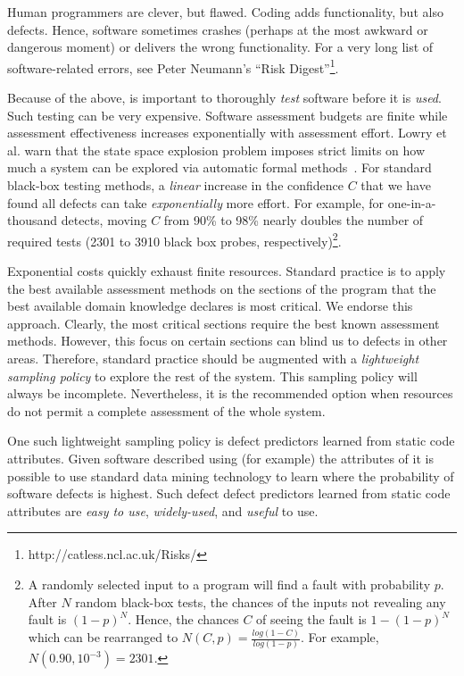 
Human programmers are clever, but flawed. Coding  adds functionality, but also defects.
Hence, software sometimes crashes (perhaps at the most awkward or dangerous moment) or delivers
the wrong functionality. For a very long list of software-related errors,
see  Peter Neumann's ``Risk Digest''\footnote{http://catless.ncl.ac.uk/Risks/}.

Because of the above, is important to thoroughly {\em test} software before it is {\em used}.
Such testing  can be very expensive.
Software assessment budgets are finite
while assessment effectiveness increases 
exponentially with assessment effort.
Lowry et al. warn that  
the state space explosion problem imposes
strict limits on how much a system can be explored
via automatic formal methods~\cite{lowrey98}.
For standard black-box testing methods,
a {\em linear} increase
in the confidence $C$ that we have found all defects
can take {\em exponentially} more effort.
For example, for one-in-a-thousand detects,
moving $C$ from  
90\% to 98\% nearly doubles the number of required tests (2301 to   3910 black box
probes, respectively)\footnote{A randomly selected 
input to a program will find a fault with probability $p$.
After $N$ random black-box tests, the chances of the inputs 
not revealing any fault 
is $(1-p)^N$. Hence, the chances $C$ of seeing the fault is $1-(1-p)^N$
which can be rearranged to 
 $N(C,p)=\frac{log(1 -
C)}{log(1-p)}$. For example, $N(0.90,10^{-3})=2301$.}.

Exponential costs quickly exhaust finite resources.
Standard practice is to apply the best
available assessment methods on the sections of the program that the
best available domain knowledge declares is most critical.  We endorse
this approach.  Clearly, the most critical sections require the best
known assessment methods. However, this focus on certain sections
can blind us to defects in other areas.
Therefore, standard practice should be augmented
with a  {\em
lightweight sampling policy} to explore the rest of the system.  This
sampling policy will always be incomplete.
Nevertheless, it is the recommended option when
resources do not permit a complete assessment of the whole system.

One such lightweight sampling policy is defect predictors learned from static code attributes.
Given software described using (for example) the attributes of  it is possible
to use standard data mining technology to learn where the probability of software defects is highest.
Such defect  defect predictors learned from
static code attributes are   {\em easy to
use}, {\em widely-used}, and {\em useful} to use.

